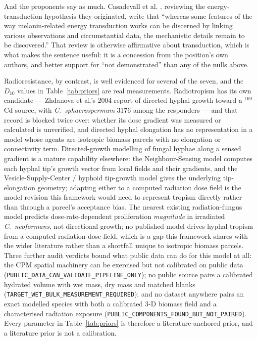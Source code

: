 \documentclass[11pt]{article}
\begin{document}
And the proponents say as much. Casadevall et al. \cite{casadevall2017}, reviewing the
energy-transduction hypothesis they originated, write that ``whereas some features of the
way melanin-related energy transduction works can be discerned by linking various
observations and circumstantial data, the mechanistic details remain to be discovered.''
That review is otherwise affirmative about transduction, which is what makes the sentence
useful: it is a concession from the position's own authors, and better support for ``not
demonstrated'' than any of the nulls above.

Radioresistance, by contrast, is well evidenced for several of the seven, and the
$D_{10}$ values in Table~\ref{tab:priors} are real measurements. Radiotropism has its own
candidate --- Zhdanova et al.'s 2004 report of directed hyphal growth toward a $^{109}$Cd source,
with \textit{C.\ sphaerospermum} 3176 among the responders --- and that record is blocked twice
over: whether its dose gradient was measured or calculated is unverified, and directed hyphal
elongation has no representation in a model whose agents are isotropic biomass parcels with no
elongation or connectivity term. Directed-growth modelling of fungal hyphae along a sensed
gradient is a mature capability elsewhere: the Neighbour-Sensing model \cite{meskauskas2004}
computes each hyphal tip's growth vector from local fields and their gradients, and the
Vesicle-Supply-Center / hyphoid tip-growth model \cite{bartnickigarcia1989} gives the
underlying tip-elongation geometry; adapting either to a computed radiation dose field is the
model revision this framework would need to represent tropism directly rather than through a
parcel's acceptance bias. The nearest existing radiation-fungus model
\cite{shuryak2014} predicts dose-rate-dependent proliferation \emph{magnitude} in irradiated
\textit{C.\ neoformans}, not directional growth; no published model drives hyphal tropism from
a computed radiation dose field, which is a gap this framework shares with the wider
literature rather than a shortfall unique to isotropic biomass parcels. Three further audit
verdicts bound what public data can do for
this model at all: the CPM spatial machinery can be exercised but not calibrated on public data
(\texttt{PUBLIC\_DATA\_CAN\_VALIDATE\_PIPELINE\_ONLY}); no public source pairs a calibrated
hydrated volume with wet mass, dry mass and matched blanks
(\texttt{TARGET\_WET\_BULK\_MEASUREMENT\_REQUIRED}); and no dataset anywhere pairs an exact
modelled species with both a calibrated 3-D biomass field and a characterised radiation exposure
(\texttt{PUBLIC\_COMPONENTS\_FOUND\_BUT\_NOT\_PAIRED}). Every parameter in Table~\ref{tab:priors}
is therefore a literature-anchored prior, and a literature prior is not a calibration.
\end{document}
